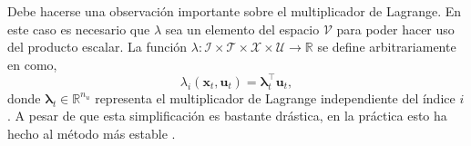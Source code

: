 Debe hacerse una observación importante sobre el multiplicador de Lagrange. En este caso es necesario que  $\lambda$ sea un elemento del espacio $\mathcal{V}$ para poder hacer uso del producto escalar. La función $\lambda:\mathcal{I}\times\mathcal{T}\times\mathcal{X}\times\mathcal{U} \rightarrow \mathbb{R}$ se define arbitrariamente en \cite{Deep_Visuomotor_Policies} como, 
\begin{equation}
    \lambda_{i}(\mathbf{x}_t, \mathbf{u}_t) = \bm{\lambda}_{t}^{\top} \mathbf{u}_t,
\end{equation}
donde $\bm\lambda_{t} \in \mathbb{R}^{n_u}$ representa el multiplicador de Lagrange independiente del índice $i$. A pesar de que esta simplificación es bastante drástica, en la práctica esto ha hecho al método más estable \cite{Deep_Visuomotor_Policies}.

